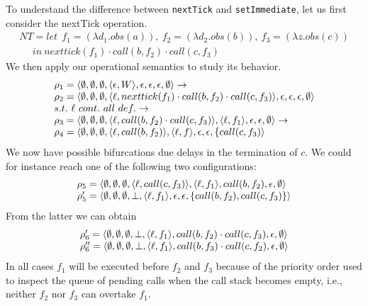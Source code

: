 To understand the difference between \verb+nextTick+ and \verb+setImmediate+, let us first consider the nextTick operation.
$$
\begin{array}{l}
NT=let\ \ f_1=(\lambda d_1.obs(a)),\ f_2=(\lambda d_2.obs(b)),\ f_3=(\lambda z. obs(c))\\
\ \ \ \ \ \ in \ nexttick(f_1)\cdot call(b,f_2)\cdot call(c,f_3) 
\end{array}
$$
We then apply our operational semantics to study its behavior.
$$
\begin{array}{l}
\rho_1=\langle \emptyset,\emptyset,\emptyset,\langle \epsilon,W \rangle,\epsilon,\epsilon,\epsilon,\emptyset \rangle
\rightarrow\\
\rho_2=\langle \emptyset,\emptyset,\emptyset,\langle \ell,nexttick(f_1)\cdot call(b,f_2)\cdot call(c,f_3) \rangle,\epsilon,\epsilon,\epsilon,\emptyset \rangle
\\ s.t.\ \ell\ cont.\ all\ def.
\rightarrow\\
\rho_3=\langle \emptyset,\emptyset,\emptyset,\langle \ell,call(b,f_2)\cdot call(c,f_3) \rangle,\langle \ell,f_1 \rangle,\epsilon,\epsilon,\emptyset \rangle
\rightarrow\\
\rho_4=\langle \emptyset,\emptyset,\emptyset,\langle \ell,call(b,f_2) \rangle,\langle \ell,f \rangle,\epsilon,\epsilon,\{call(c,f_3) \rangle
\end{array}
$$
We now have possible bifurcations due delays in the termination of $c$.
We could for instance reach one of the following two configurations:
$$
\begin{array}{l}
\rho_5=\langle \emptyset,\emptyset,\emptyset,\langle \ell,call(c,f_3) \rangle,\langle \ell,f_1 \rangle,call(b,f_2),\epsilon,\emptyset \rangle
\\
\rho_5'=\langle \emptyset,\emptyset,\emptyset,\bot,\langle \ell,f_1 \rangle,\epsilon,\epsilon,\{call(b,f_2),call(c,f_3)\} \rangle
\end{array}
$$
From the latter we can obtain 
$$
\begin{array}{l}
\rho_6'=\langle \emptyset,\emptyset,\emptyset,\bot,\langle \ell,f_1 \rangle, call(b,f_2)\cdot call(c,f_3),\epsilon,\emptyset \rangle
\\
\rho_6''=\langle \emptyset,\emptyset,\emptyset,\bot,\langle \ell,f_1 \rangle,call(b,f_3)\cdot call(c,f_2),\epsilon,\emptyset \rangle
\end{array}
$$
In all cases $f_1$ will be executed before $f_2$ and $f_3$ because of the priority order used to inspect the queue of pending 
calls when the call stack becomes empty, i.e., neither $f_2$ nor $f_3$ can overtake $f_1$.

